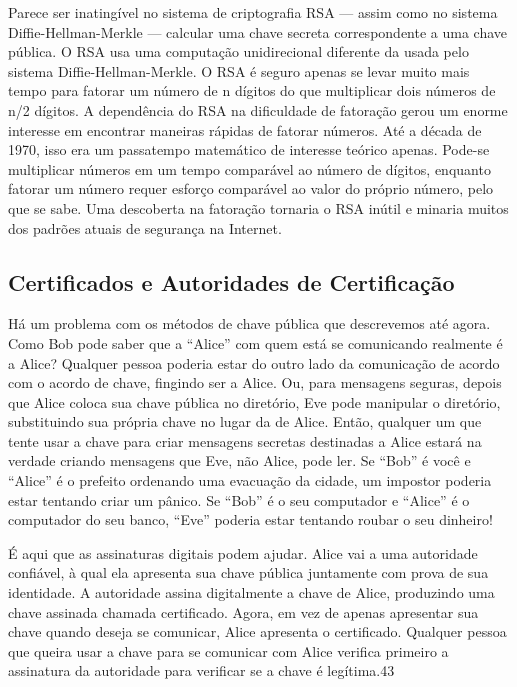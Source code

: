 \documentclass{book}
\begin{document}
Parece ser inatingível no sistema de criptografia RSA --- assim como no sistema Diffie-Hellman-Merkle --- calcular uma chave secreta correspondente a uma chave pública. O RSA usa uma computação unidirecional diferente da usada pelo sistema Diffie-Hellman-Merkle. O RSA é seguro apenas se levar muito mais tempo para fatorar um número de n dígitos do que multiplicar dois números de n/2 dígitos. A dependência do RSA na dificuldade de fatoração gerou um enorme interesse em encontrar maneiras rápidas de fatorar números. Até a década de 1970, isso era um passatempo matemático de interesse teórico apenas. Pode-se multiplicar números em um tempo comparável ao número de dígitos, enquanto fatorar um número requer esforço comparável ao valor do próprio número, pelo que se sabe. Uma descoberta na fatoração tornaria o RSA inútil e minaria muitos dos padrões atuais de segurança na Internet.


\subsection{Certificados e Autoridades de Certificação}
\label{segredos:certificados-aut-cert}

Há um problema com os métodos de chave pública que descrevemos até agora. Como Bob pode saber que a ``Alice'' com quem está se comunicando realmente é a Alice? Qualquer pessoa poderia estar do outro lado da comunicação de acordo com o acordo de chave, fingindo ser a Alice. Ou, para mensagens seguras, depois que Alice coloca sua chave pública no diretório, Eve pode manipular o diretório, substituindo sua própria chave no lugar da de Alice. Então, qualquer um que tente usar a chave para criar mensagens secretas destinadas a Alice estará na verdade criando mensagens que Eve, não Alice, pode ler. Se ``Bob'' é você e ``Alice'' é o prefeito ordenando uma evacuação da cidade, um impostor poderia estar tentando criar um pânico. Se ``Bob'' é o seu computador e ``Alice'' é o computador do seu banco, ``Eve'' poderia estar tentando roubar o seu dinheiro!

É aqui que as assinaturas digitais podem ajudar. Alice vai a uma autoridade confiável, à qual ela apresenta sua chave pública juntamente com prova de sua identidade. A autoridade assina digitalmente a chave de Alice, produzindo uma chave assinada chamada certificado. Agora, em vez de apenas apresentar sua chave quando deseja se comunicar, Alice apresenta o certificado. Qualquer pessoa que queira usar a chave para se comunicar com Alice verifica primeiro a assinatura da autoridade para verificar se a chave é legítima.43
\end{document}
